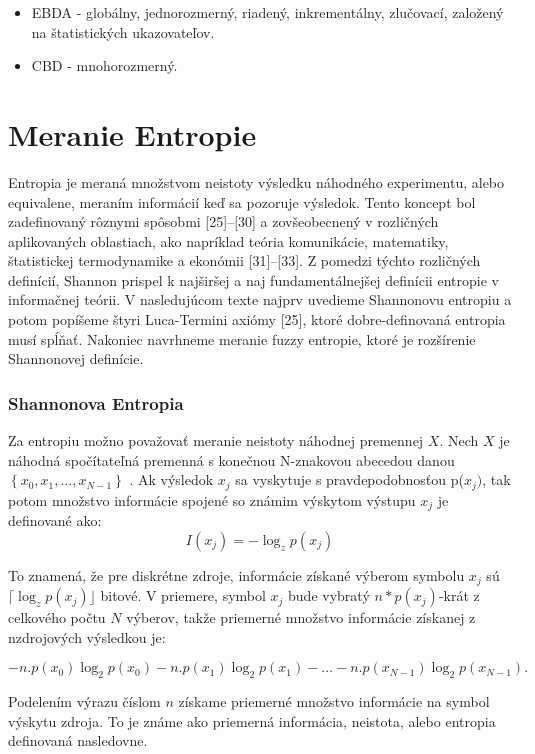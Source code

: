 \begin{itemize}
\item
EBDA - globálny, jednorozmerný, riadený, inkrementálny, zlučovací, založený na štatistických ukazovateľov. 
\cite{Sang2010} 
\item
CBD - mnohorozmerný. 
\cite{Garcia2010} 

\end{itemize}





\section{Meranie Entropie}
Entropia je meraná množstvom neistoty výsledku náhodného experimentu, alebo equivalene, meraním informácií keď sa pozoruje výsledok. Tento koncept bol zadefinovaný rôznymi spôsobmi [25]–[30] a zovšeobecnený v rozličných aplikovaných oblastiach, ako napríklad teória komunikácie, matematiky, štatistickej termodynamike a ekonómii [31]–[33]. Z pomedzi týchto rozličných definícií, Shannon prispel k najširšej a naj fundamentálnejšej definícii entropie v informačnej teórii. V nasledujúcom texte najprv uvedieme Shannonovu entropiu a potom popíšeme štyri Luca-Termini axiómy [25], ktoré dobre-definovaná entropia musí spĺňať. Nakoniec navrhneme meranie fuzzy entropie, ktoré je rozšírenie Shannonovej definície.

\subsubsection{Shannonova Entropia}
Za entropiu možno považovať meranie neistoty náhodnej premennej $X$. Nech $X$ je náhodná spočítateľná premenná s konečnou N-znakovou abecedou danou $ \left\{ x_0, x_1, \ldots, x_{N-1} \right\}$  .
Ak výsledok $x_j$ sa vyskytuje s pravdepodobnosťou p($x_j)$, tak potom množstvo informácie spojené so známim výskytom výstupu $x_j$ je definované ako:
$$ I(x_j)=-\log_z p(x_j) $$

To znamená, že pre diskrétne zdroje, informácie získané výberom symbolu $x_j$ sú $\lceil \log_zp(x_j)  \rfloor$ bitové. V priemere, symbol $x_j$ bude vybratý $n*p(x_j)$-krát z celkového počtu $N$ výberov, takže priemerné množstvo informácie získanej z nzdrojových výsledkou je:

$$
-n.p(x_0)\log_2p(x_0) - n.p(x_1)\log_2p(x_1) - \ldots 
-n.p(x_{N-1})\log_2p(x_{N-1}).
$$

Podelením výrazu číslom $n$ získame priemerné množstvo informácie na symbol výskytu zdroja. To je známe ako priemerná informácia, neistota, alebo entropia definovaná nasledovne.

